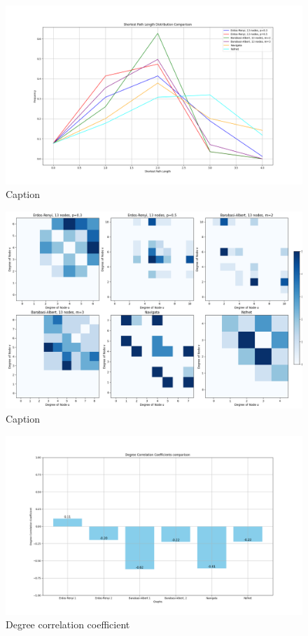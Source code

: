 \begin{figure}
    \centering
    \includegraphics[width=0.9\linewidth]{images/FINAL-TOPO-COMP/line-13.png}
    \caption{Caption}
    \label{fig:enter-label}
\end{figure}

\begin{figure}
    \centering
    \includegraphics[width=0.9\linewidth]{images/FINAL-TOPO-COMP/Degree-correlation-matrices/13-matrix.png}
    \caption{Caption}
    \label{fig:enter-label}
\end{figure}

\begin{figure}
    \centering
    \includegraphics[width=0.9\linewidth]{images/FINAL-TOPO-COMP/Degree-correlation-coeff/deg-coeff-13.png}
    \caption{Degree correlation coefficient}
    \label{fig:enter-label}
\end{figure}

